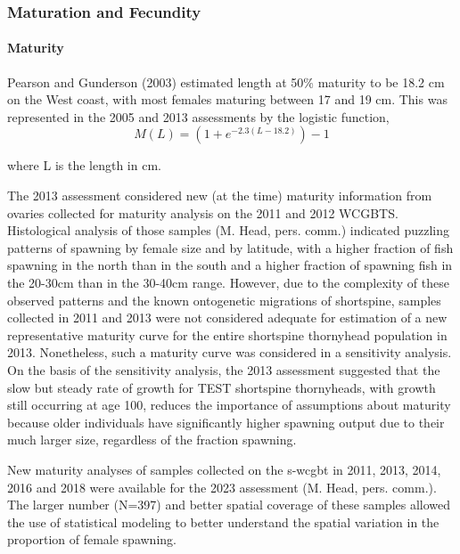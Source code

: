 \documentclass[11pt,
  english,
  letterpaper,
]{article}
\begin{document}
\hypertarget{maturation-and-fecundity}{%
\subsubsection{Maturation and Fecundity}\label{maturation-and-fecundity}}

\hypertarget{maturity}{%
\paragraph{Maturity}\label{maturity}}

Pearson and Gunderson (2003) estimated length at 50\% maturity to be 18.2 cm on the West coast, with most females maturing between 17 and 19 cm. This was represented in the 2005 and 2013 assessments by the logistic function, \begin{equation} M(L) = (1 + e^{-2.3(L-18.2)})-1\end{equation}

where L is the length in cm.

The 2013 assessment considered new (at the time) maturity information from ovaries collected for maturity analysis on the 2011 and 2012 WCGBTS. Histological analysis of those samples (M. Head, pers. comm.) indicated puzzling patterns of spawning by female size and by latitude, with a higher fraction of fish spawning in the north than in the south and a higher fraction of spawning fish in the 20-30cm than in the 30-40cm range. However, due to the complexity of these observed patterns and the known ontogenetic migrations of shortspine, samples collected in 2011 and 2013 were not considered adequate for estimation of a new representative maturity curve for the entire shortspine thornyhead population in 2013. Nonetheless, such a maturity curve was considered in a sensitivity analysis. On the basis of the sensitivity analysis, the 2013 assessment suggested that the slow but steady rate of growth for TEST shortspine thornyheads, with growth still occurring at age 100, reduces the importance of assumptions about maturity because older individuals have significantly higher spawning output due to their much larger size, regardless of the fraction spawning.

New maturity analyses of samples collected on the \gls{s-wcgbt} in 2011, 2013, 2014, 2016 and 2018 were available for the 2023 assessment (M. Head, pers. comm.). The larger number (N=397) and better spatial coverage of these samples allowed the use of statistical modeling to better understand the spatial variation in the proportion of female spawning.
\end{document}
